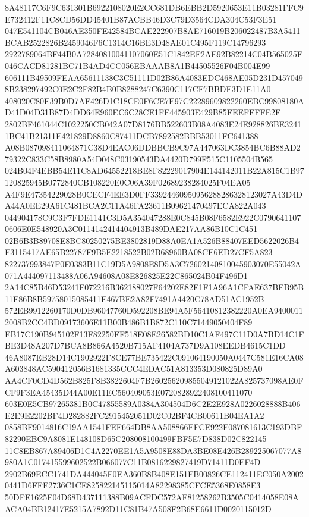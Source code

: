 \documentclass[UTF8,fontset=fandol,zihao=-4,a4paper]{ctexart}
\begin{document}
{{8A48117C6F9C631301B6922108020E2CC681DB6EBB2D5920653E11B03281FFC9E732412F11C8CD56DD45401B87ACBB46D3C79D3564CDA304C53F3E51
047E541104CB046AE350FE42584BCAE222907B8AE716019B206022487B3A5411BCAB2522826B2459046F6C1314C16BE3D48AE01C495F119C14796293
2922789064BF44B0A72840810041107060E51C1842EF2AE92B82214C04B565025F046CACD81281BC71B4AD4CC056EBAAAB8A1B44505526F04B004E99
606111B49509FEAA65611138C3C51111D02B86A4083EDC468AE05D231D4570498B238297492C0E2C2F82B4B0B8288247C6390C117CF7BBDF3D1E11A0
408020C80E39B0D7AF426D1C18CE0F6CE7E97C22289609822260EBC99808180AD41D04D31B87D4DD64E960EC6C28CE1FF445903E429B85FEEFFFFE2F
2802BF461044C1022250CB042A07D8176BB522603B08A4083E24E928826BE32411BC41B21311E421829D8860C87411DCB7892582BBB53011FC641388
A08B087098411064871C38D4EAC06DDBBCB9C97A447063DC3854BC6B88AD279322C833C58B8980A54D048C03190543DA4420D799F515C1105504B565
024B04F4EBB54E11C8AD64552218BE8F82229017904E144142011B22A815C1B97120825945B0772840CB108220E0C06A39F02689238284025F04EA05
A4F9E47354229028B0CECF4EE3D0FF33924460950956288286328123027A43D4DA44A0EE29A61C481BCA2C11A46FA23611B09621470497ECA822A043
044904178C9C3F7FDE1141C3D5A354047288E0C845B08F6582E922C07906411070606E0E548920A3C0114142414404913B489DAE217AA86B10C1C451
02B6B3B89708E8BC80250275BE3802819D88A0EA1A526B88407EED5622026B4F3115417AE65B22787F9B5E2218522B02B68960BA08CE6ED27CF5A823
822737993847F0E0383B11C19D5A9808E8D5A3C72602140810045903070E55042A071A444097113488A06A94608A08E826825E22C865024B04F496D1
2A14C85B46D53241F072216B362188027F64202E82E1F1A96A1CFAE637BFB95B11F86B8B59758015085411E467BE2A82F7491A4420C78AD51AC1952B
572EB9912260170D0DB96047760D592208BE94A5F56410812382220A0EA94000112008B2CC4BD09173606E11B00B486B1B872C110C71449050404F89
EB17C190B945102F13F82250FF518E08E26582BD10C1AF497C11D0A7BD14C1FBE3D48A207D7BCA8B866A4520B715AF4104A737D9A108EEDB4615C1DD
46A8087EB28D14C1902922F8CE77BE735422C091064190050A0447C581E16CA08A603848AC590412056B1681335CCC4EDAC51A813353D080825D89A0
AA4CF0CD4D562B825F8B3822604F7B260256209855049121022A825737098AE0FCF9F3EA45435D44A00E11EC560409053E0720828922408100411070
603E0E5CB97265381B0C47855589A0384A304504D6C2E2E928A0226028888B406E2E9E2202BF4D282882FC2915452051D02C02BF4CB00611B04EA1A2
0858BF9014816C19AA1541FEF664DB8AA508866FFCE922F087081613C193DBF82290EBC9A8081E148108D65C208008100499FBF5E7D838D02C822145
11C8EB867A89406D1C4A2270EE1A5A9508E88DA3BE08E426B289225067077A8980A1C017415599602522B066077C11B0816229827419D71411D0EF4D
2902B69ECC1741DA444045F0EA360B8B408E151FB00826CE112411EC050A20020441D6FFE2736C1CE825822145115014A82298385CFCE5368E0858E3
50DFE1625F04D68D437111388B09ACFDC572AF81258262B3505C0414058E08AACA04BB12417E5215A7892D11C81B47A508F2B68E6611D0020115012D
}}
\end{document}
